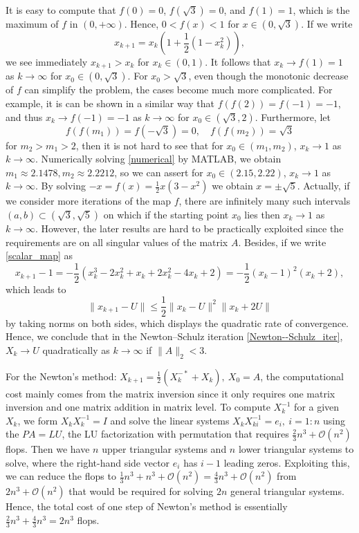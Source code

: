 \documentclass[12pt]{article}
\def\norm#1{\|#1\|}
\begin{document}
It is easy to compute that $f(0)=0$, $f(\sqrt{3})=0$, and $f(1)=1$, which is the maximum of $f$ in $(0,+\infty)$. Hence, $0<f(x)<1$ for $x\in(0,\sqrt{3})$. If we write
$$
x_{k+1}=x_k(1+\frac{1}{2}(1-x_k^2)),
$$
we see immediately $x_{k+1}>x_k$ for $x_k\in (0,1)$. It follows that $x_k\to f(1)=1$ as $k\to \infty$ for $x_0\in (0,\sqrt{3})$. For $x_0>\sqrt{3}$, even though the monotonic decrease of $f$ can simplify the problem, the cases become much more complicated. For example, it is can be shown in a similar way that $f(f(2))=f(-1)=-1$, and thus $x_k\to f(-1)=-1$ as $k\to \infty$ for $x_0\in (\sqrt{3},2)$. Furthermore, let
\begin{equation}\label{numerical}
f(f(m_1))=f(-\sqrt{3})=0, \quad f(f(m_2))=\sqrt{3}
\end{equation}
for $m_2>m_1>2$, then it is not hard to see that for $x_0\in (m_1,m_2)$, $x_k\to 1$ as $k\to \infty$. Numerically solving \eqref{numerical} by MATLAB, we obtain $m_1\approx2.1478, m_2\approx2.2212$, so we can assert for $x_0\in (2.15,2.22)$, $x_k\to 1$ as $k\to \infty$. By solving $-x=f(x)=\frac{1}{2}x(3-x^2)$ we obtain $x=\pm \sqrt{5}$. Actually, if we consider more iterations of the map $f$, there are infinitely many such intervals $(a,b)\subset(\sqrt{3},\sqrt{5})$ on which if the starting point $x_0$ lies then $x_k\to 1$ as $k\to \infty$. However, the later results are hard to be practically exploited since the requirements are on all singular values of the matrix $A$. Besides, if we write \eqref{scalar_map} as 
$$
x_{k+1}-1 = -\frac{1}{2}(x_k^3-2x_k^2+x_k+2x_k^2-4x_k+2)
=-\frac{1}{2}(x_k-1)^2(x_k+2),
$$
which leads to 
$$
\norm{x_{k+1}-U}\le \frac{1}{2}\norm{x_{k}-U}^2\norm{x_{k}+2U}
$$
by taking norms on both sides, which displays the quadratic rate of convergence. Hence, we conclude that in the Newton--Schulz iteration \eqref{Newton--Schulz_iter}, $X_k\to U$ quadratically as $k\to\infty$ if $\norm{A}_2<3$.
 \vspace{.2cm}
 
 

 For the Newton's method: $X_{k+1} = \frac{1}{2}(X_k^{-*}+X_k),\ X_0=A$, the computational cost mainly comes from the matrix inversion since it only requires one matrix inversion and one matrix addition in matrix level. To compute $X_k^{-1}$ for a given $X_k$, we form $X_kX_k^{-1}=I$ and solve the linear systems $X_kX_{ki}^{-1}=e_i,\ i=1:n$ using the $PA=LU$, the LU factorization with permutation that requires $\frac{2}{3}n^3+\mathcal{O}(n^2)$ flops. Then we have $n$ upper triangular systems and $n$ lower triangular systems to solve, where the right-hand side vector $e_i$ has $i-1$ leading zeros. Exploiting this, we can reduce the flops to $\frac{1}{3}n^3+n^3+\mathcal{O}(n^2)=\frac{4}{3}n^3+\mathcal{O}(n^2)$ from $2n^3+\mathcal{O}(n^2)$ that would be required for solving $2n$ general triangular systems. Hence, the total cost of one step of Newton's method is essentially $\frac{2}{3}n^3+\frac{4}{3}n^3=2n^3$ flops. 
\end{document}
